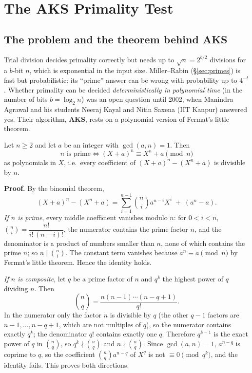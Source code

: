 \section{The AKS Primality Test}\label{sec:aks}

\subsection{The problem and the theorem behind AKS \new}

Trial division decides primality correctly but needs up to $\sqrt n = 2^{b/2}$ divisions for a $b$-bit $n$, which is exponential in the input size. Miller--Rabin (\S\ref{sec:primes}) is fast but probabilistic: its ``prime'' answer can be wrong with probability up to $4^{-t}$. Whether primality can be decided \emph{deterministically in polynomial time} (in the number of bits $b = \log_2 n$) was an open question until 2002, when Manindra Agrawal and his students Neeraj Kayal and Nitin Saxena (IIT Kanpur) answered yes. Their algorithm, \textbf{AKS}, rests on a polynomial version of Fermat's little theorem.

\begin{mustknow}
Let $n \ge 2$ and let $a$ be an integer with $\gcd(a, n) = 1$. Then
\[
n \text{ is prime} \iff (X + a)^n \equiv X^n + a \pmod n
\]
as polynomials in $X$, i.e.\ every coefficient of $(X + a)^n - (X^n + a)$ is divisible by $n$.
\end{mustknow}

\textbf{Proof.} By the binomial theorem,
\[
(X + a)^n - (X^n + a) = \sum_{i=1}^{n-1} \binom{n}{i} a^{n-i} X^i \;+\; (a^n - a).
\]
\emph{If $n$ is prime}, every middle coefficient vanishes modulo $n$: for $0 < i < n$, $\binom{n}{i} = \dfrac{n!}{i!\,(n-i)!}$, the numerator contains the prime factor $n$, and the denominator is a product of numbers smaller than $n$, none of which contains the prime $n$; so $n \mid \binom{n}{i}$. The constant term vanishes because $a^n \equiv a \pmod n$ by Fermat's little theorem. Hence the identity holds.

\emph{If $n$ is composite}, let $q$ be a prime factor of $n$ and $q^k$ the highest power of $q$ dividing $n$. Then
\[
\binom{n}{q} = \frac{n(n-1)\cdots(n-q+1)}{q!}.
\]
In the numerator only the factor $n$ is divisible by $q$ (the other $q - 1$ factors are $n - 1, \dots, n - q + 1$, which are not multiples of $q$), so the numerator contains exactly $q^k$; the denominator $q!$ contains exactly one $q$. Therefore $q^{k-1}$ is the exact power of $q$ in $\binom{n}{q}$, so $q^k \nmid \binom{n}{q}$ and $n \nmid \binom{n}{q}$. Since $\gcd(a, n) = 1$, $a^{n-q}$ is coprime to $q$, so the coefficient $\binom{n}{q} a^{n-q}$ of $X^q$ is not $\equiv 0 \pmod{q^k}$, and the identity fails. This proves both directions.

